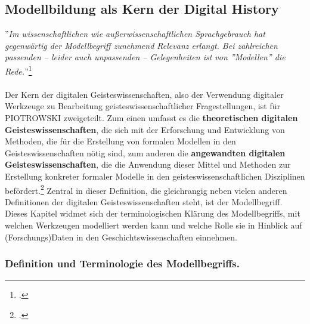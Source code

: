 \documentclass[12pt,a4paper]{article}
\begin{document}
\subsection{Modellbildung als Kern der Digital History}
\label{Modellbildung}
''\textit{Im wissenschaftlichen wie außerwissenschaftlichen Sprachgebrauch hat gegenwärtig der Modellbegriff zunehmend Relevanz erlangt. Bei zahlreichen passenden -- leider auch unpassenden -- Gelegenheiten ist von ''Modellen'' die Rede.}''\footcite[][S.1]{stachowiak1973allgemeine}
\\
\\
Der Kern der digitalen Geisteswissenschaften, also der Verwendung digitaler Werkzeuge zu Bearbeitung geisteswissenschaftlicher Fragestellungen, ist für PIOTROWSKI zweigeteilt. Zum einen umfasst es die \textbf{theoretischen digitalen Geisteswissenschaften}, die sich mit der Erforschung und Entwicklung von Methoden, die für die Erstellung von formalen Modellen in den Geisteswissenschaften nötig sind, zum anderen die \textbf{angewandten digitalen Geisteswissenschaften}, die die Anwendung dieser Mittel und Methoden zur Erstellung konkreter formaler Modelle in den geisteswissenschaftlichen Disziplinen befördert.\footcite{piotrowski2016digital} Zentral in dieser Definition, die gleichrangig neben vielen anderen Definitionen der digitalen Geisteswissenschaften steht, ist der Modellbegriff. 
\\
Dieses Kapitel widmet sich der terminologischen Klärung des Modellbegriffs, mit welchen Werkzeugen modelliert werden kann und welche Rolle sie in Hinblick auf (Forschungs)Daten in den Geschichtswissenschaften einnehmen.

\subsubsection{Definition und Terminologie des Modellbegriffs.}
\label{Modell_def}
\end{document}
